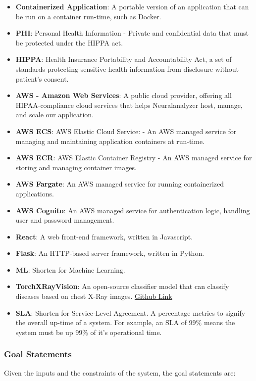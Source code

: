 \documentclass[12pt]{article}
\begin{document}
\begin{itemize}

\item \textbf{Containerized Application}: A portable version of an application that can be run on a container run-time, such as Docker.
\item \textbf{PHI}: Personal Health Information - Private and confidential data that must be protected under the HIPPA act.
\item \textbf{HIPPA}: Health Insurance Portability and Accountability Act, a set of standards protecting sensitive health information from disclosure without patient's consent.
\item \textbf{AWS - Amazon Web Services}: A public cloud provider, offering all HIPAA-compliance cloud services that helps Neuralanalyzer host, manage, and scale our application.
\item \textbf{AWS ECS}: AWS Elastic Cloud Service: - An AWS managed service for managing and maintaining application containers at run-time.
\item \textbf{AWS ECR}: AWS Elastic Container Registry - An AWS managed service for storing and managing container images.
\item \textbf{AWS Fargate}: An AWS managed service for running containerized applications.
\item \textbf{AWS Cognito}: An AWS managed service for authentication logic, handling user and password management.
\item \textbf{React}: A web front-end framework, written in Javascript.
\item \textbf{Flask}: An HTTP-based server framework, written in Python.
\item \textbf{ML}: Shorten for Machine Learning.
\item \textbf{TorchXRayVision}: An open-source classifier model that can classify diseases based on chest X-Ray images. \href{https://github.com/mlmed/torchxrayvision}{Github Link}
\item \textbf{SLA}: Shorten for Service-Level Agreement. A percentage metrics to signify the overall up-time of a system. For example, an SLA of 99\% means the system must be up 99\% of it's operational time.

\end{itemize}

\subsubsection{Goal Statements}
\noindent Given the inputs and the constraints of the system, the goal statements are:
\end{document}
